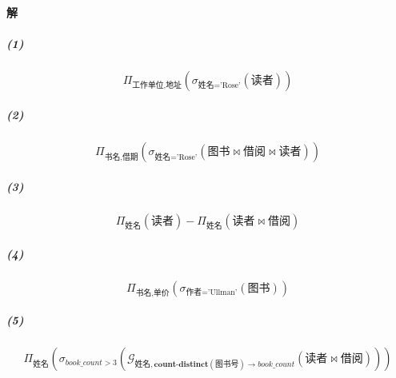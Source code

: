 \documentclass{article}
\begin{document}
\paragraph{解}
\subparagraph{(1)}
{ \kaishu
\begin{Large}
\begin{equation*}
    \Pi_{\text{工作单位}, \text{地址}}(\sigma_{\text{姓名} = \text{'Rose'}}(\text{读者}))
\end{equation*}
\end{Large}

\subparagraph{(2)}
\begin{Large}
\begin{equation*}
    \Pi_{\text{书名}, \text{借期}}(\sigma_{\text{姓名} = \text{'Rose'}}(\text{图书} \Join \text{借阅} \Join \text{读者}))
\end{equation*}
\end{Large}

\subparagraph{(3)}
\begin{Large}
\begin{equation*}
    \Pi_{\text{姓名}}(\text{读者}) - \Pi_{\text{姓名}}(\text{读者} \Join \text{借阅})
\end{equation*}
\end{Large}

\subparagraph{(4)}
\begin{Large}
\begin{equation*}
    \Pi_{\text{书名}, \text{单价}}(\sigma_{\text{作者} = \text{'Ullman'}}(\text{图书}))
\end{equation*}
\end{Large}

\subparagraph{(5)}
\begin{Large}
\begin{equation*}
    \Pi_{\text{姓名}}(\sigma_{\textit{book\_count} > 3}(\mathcal{G}_{\text{姓名}, \textbf{count-distinct}(\text{图书号}) \rightarrow \textit{book\_count}}(\text{读者} \Join \text{借阅})))
\end{equation*}
\end{Large}
}
\end{document}
